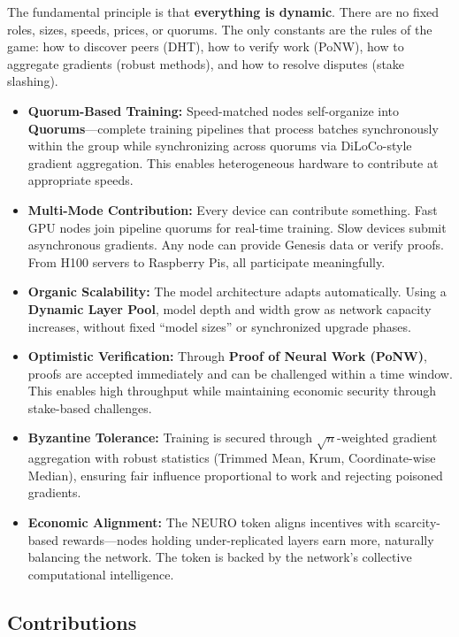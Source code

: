 \documentclass[11pt,a4paper]{article}
\begin{document}
The fundamental principle is that \textbf{everything is dynamic}. There are no fixed roles, sizes, speeds, prices, or quorums. The only constants are the rules of the game: how to discover peers (DHT), how to verify work (PoNW), how to aggregate gradients (robust methods), and how to resolve disputes (stake slashing).

\begin{itemize}
    \item \textbf{Quorum-Based Training:} Speed-matched nodes self-organize into \textbf{Quorums}---complete training pipelines that process batches synchronously within the group while synchronizing across quorums via DiLoCo-style gradient aggregation. This enables heterogeneous hardware to contribute at appropriate speeds.
    \item \textbf{Multi-Mode Contribution:} Every device can contribute something. Fast GPU nodes join pipeline quorums for real-time training. Slow devices submit asynchronous gradients. Any node can provide Genesis data or verify proofs. From H100 servers to Raspberry Pis, all participate meaningfully.
    \item \textbf{Organic Scalability:} The model architecture adapts automatically. Using a \textbf{Dynamic Layer Pool}, model depth and width grow as network capacity increases, without fixed ``model sizes'' or synchronized upgrade phases.
    \item \textbf{Optimistic Verification:} Through \textbf{Proof of Neural Work (PoNW)}, proofs are accepted immediately and can be challenged within a time window. This enables high throughput while maintaining economic security through stake-based challenges.
    \item \textbf{Byzantine Tolerance:} Training is secured through $\sqrt{n}$-weighted gradient aggregation with robust statistics (Trimmed Mean, Krum, Coordinate-wise Median), ensuring fair influence proportional to work and rejecting poisoned gradients.
    \item \textbf{Economic Alignment:} The NEURO token aligns incentives with scarcity-based rewards---nodes holding under-replicated layers earn more, naturally balancing the network. The token is backed by the network's collective computational intelligence.
\end{itemize}

\subsection{Contributions}
\end{document}
